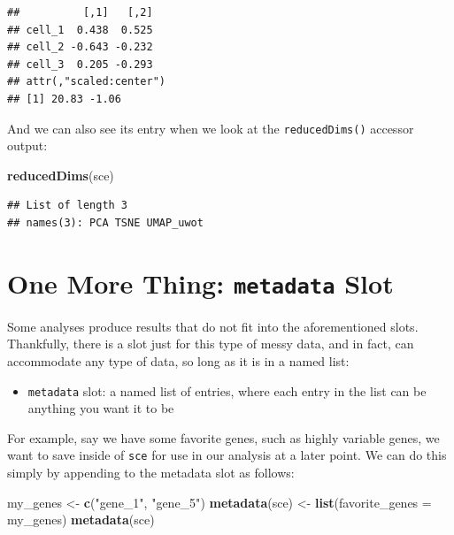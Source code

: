\documentclass[]{book}
\newenvironment{Shaded}{\begin{snugshade}}{\end{snugshade}}
\newcommand{\DataTypeTok}[1]{\textcolor[rgb]{0.13,0.29,0.53}{#1}}
\newcommand{\KeywordTok}[1]{\textcolor[rgb]{0.13,0.29,0.53}{\textbf{#1}}}
\newcommand{\NormalTok}[1]{#1}
\newcommand{\StringTok}[1]{\textcolor[rgb]{0.31,0.60,0.02}{#1}}
\providecommand{\tightlist}{%
  \setlength{\itemsep}{0pt}\setlength{\parskip}{0pt}}
\begin{document}
\begin{verbatim}
##          [,1]   [,2]
## cell_1  0.438  0.525
## cell_2 -0.643 -0.232
## cell_3  0.205 -0.293
## attr(,"scaled:center")
## [1] 20.83 -1.06
\end{verbatim}

And we can also see its entry when we look at the \texttt{reducedDims()} accessor output:

\begin{Shaded}
\begin{Highlighting}[]
\KeywordTok{reducedDims}\NormalTok{(sce)}
\end{Highlighting}
\end{Shaded}

\begin{verbatim}
## List of length 3
## names(3): PCA TSNE UMAP_uwot
\end{verbatim}

\hypertarget{one-more-thing-metadata-slot}{%
\section{\texorpdfstring{One More Thing: \texttt{metadata} Slot}{One More Thing: metadata Slot}}\label{one-more-thing-metadata-slot}}

Some analyses produce results that do not fit into the aforementioned slots. Thankfully, there is a slot just for this type of messy data, and in fact, can accommodate any type of data, so long as it is in a named list:

\begin{itemize}
\tightlist
\item
  \texttt{metadata} slot: a named list of entries, where each entry in the list can be anything you want it to be
\end{itemize}

For example, say we have some favorite genes, such as highly variable genes, we want to save inside of \texttt{sce} for use in our analysis at a later point. We can do this simply by appending to the metadata slot as follows:

\begin{Shaded}
\begin{Highlighting}[]
\NormalTok{my_genes <-}\StringTok{ }\KeywordTok{c}\NormalTok{(}\StringTok{"gene_1"}\NormalTok{, }\StringTok{"gene_5"}\NormalTok{)}
\KeywordTok{metadata}\NormalTok{(sce) <-}\StringTok{ }\KeywordTok{list}\NormalTok{(}\DataTypeTok{favorite_genes =}\NormalTok{ my_genes)}
\KeywordTok{metadata}\NormalTok{(sce)}
\end{Highlighting}
\end{Shaded}
\end{document}
